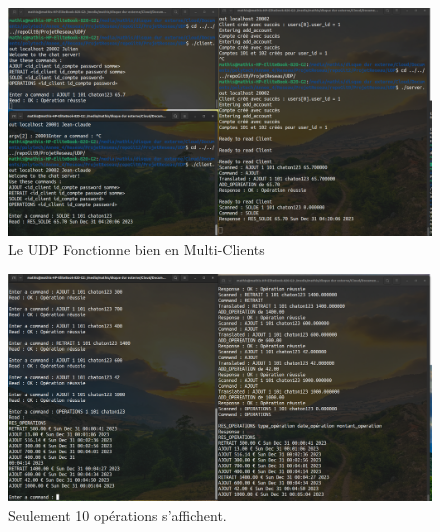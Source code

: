 \documentclass{article}
\begin{document}
\begin{figure}[h]
    \hspace*{-2cm}  
    \includegraphics[width=1.25\linewidth]{UDPmultiClients.png}
    \caption{\label{fig:UDPmultiClients}Le UDP Fonctionne bien en Multi-Clients}
\end{figure}

\begin{figure}[h]
    \hspace*{-2cm}  
    \includegraphics[width=1.25\linewidth]{OPERATIONS_TCP.png}
    \caption{\label{fig:OPERATIONS_TCP}Seulement 10 opérations s'affichent.}
\end{figure}
\end{document}
